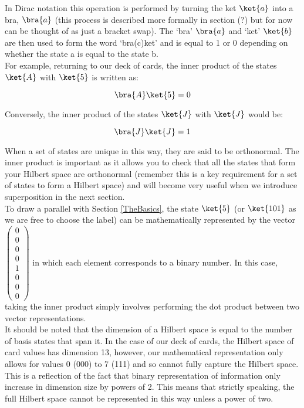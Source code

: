 In Dirac notation this operation is performed by turning the ket $\ket{a}$ into a bra, $\bra{a}$ (this process is described more formally in section (?) but for now can be thought of as just a bracket swap). The `bra' $\bra{a}$ and `ket' $\ket{b}$ are then used to form the word `bra(c)ket' and is equal to 1 or 0 depending on whether the state a is equal to the state b.\\

For example, returning to our deck of cards, the inner product of the states $\ket{A}$ with $\ket{5}$ is written as:

\begin{equation}\label{Example_Inner_Product}
\bra{A}\ket{5} = 0
\end{equation}

Conversely, the inner product of the states $\ket{J}$ with $\ket{J}$ would be:

\begin{equation}
\bra{J}\ket{J} = 1
\end{equation}

When a set of states are unique in this way, they are said to be orthonormal. The inner product is important as it allows you to check that all the states that form your Hilbert space are orthonormal (remember this is a key requirement for a set of states to form a Hilbert space) and will become very useful when we introduce superposition in the next section.\\

To draw a parallel with Section \ref{TheBasics}, the state $\ket{5}$ (or $\ket{101}$ as we are free to choose the label) can be mathematically represented by the vector $\begin{pmatrix}0\\0\\0\\0\\1\\0\\0\\0\end{pmatrix}$ in which each element corresponds to a binary number. In this case, taking the inner product simply involves performing the dot product between two vector representations.\\

It should be noted that the dimension of a Hilbert space is equal to the number of basis states that span it. In the case of our deck of cards, the Hilbert space of card values has dimension 13, however, our mathematical representation only allows for values 0 (000) to 7 (111) and so cannot fully capture the Hilbert space. This is a reflection of the fact that binary representation of information only increase in dimension size by powers of 2. This means that strictly speaking, the full Hilbert space cannot be represented in this way unless a power of two.\\

